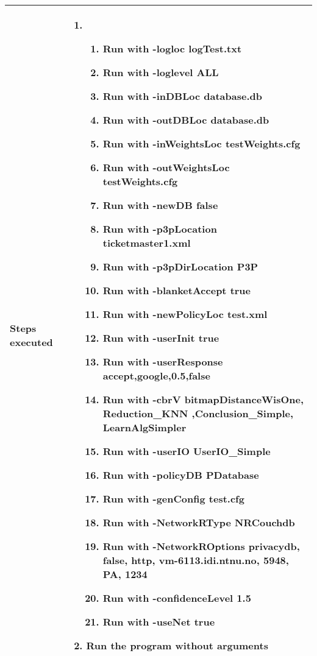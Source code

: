 \begin{center}
\begin{longtable}{ | p{4cm} | p{10cm} | }
			Steps executed & 	\begin{enumerate}
							\item
							\begin{enumerate}
								\item Run with -logloc logTest.txt
								\item Run with -loglevel ALL
								\item Run with -inDBLoc database.db
								\item Run with -outDBLoc database.db
								\item Run with -inWeightsLoc testWeights.cfg
								\item Run with -outWeightsLoc testWeights.cfg
								\item Run with -newDB false
								\item Run with -p3pLocation ticketmaster1.xml
								\item Run with -p3pDirLocation P3P
								\item Run with -blanketAccept true
								\item Run with -newPolicyLoc test.xml
								\item Run with -userInit true
								\item Run with -userResponse accept,google,0.5,false
								\item Run with -cbrV bitmapDistanceWisOne, Reduction\_KNN ,Conclusion\_Simple, LearnAlgSimpler
								\item Run with -userIO UserIO\_Simple
								\item Run with -policyDB PDatabase
								\item Run with -genConfig test.cfg
								\item Run with -NetworkRType NRCouchdb
								\item Run with -NetworkROptions privacydb, false, http, vm-6113.idi.ntnu.no, 5948, PA, 1234
								\item Run with -confidenceLevel 1.5
								\item Run with -useNet true
							\end{enumerate}
							\item Run the program without arguments
						\end{enumerate} \\ [3pt] \hline
			

\end{longtable}
\end{center}
